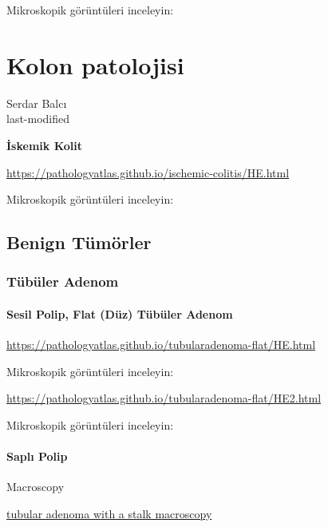\documentclass[
  letterpaper,
  DIV=11,
  numbers=noendperiod]{scrreprt}
\begin{document}
Mikroskopik görüntüleri inceleyin:

\hypertarget{kolon-patolojisi}{%
\chapter{Kolon patolojisi}\label{kolon-patolojisi}}

Serdar Balcı\\
last-modified

\hfill\break

\textbf{İskemik Kolit}

\url{https://pathologyatlas.github.io/ischemic-colitis/HE.html}

Mikroskopik görüntüleri inceleyin:

\hypertarget{benign-tuxfcmuxf6rler-1}{%
\section{Benign Tümörler}\label{benign-tuxfcmuxf6rler-1}}

\hypertarget{tuxfcbuxfcler-adenom-1}{%
\subsection{Tübüler Adenom}\label{tuxfcbuxfcler-adenom-1}}

\hypertarget{sesil-polip-flat-duxfcz-tuxfcbuxfcler-adenom-1}{%
\subsubsection{Sesil Polip, Flat (Düz) Tübüler
Adenom}\label{sesil-polip-flat-duxfcz-tuxfcbuxfcler-adenom-1}}

\url{https://pathologyatlas.github.io/tubularadenoma-flat/HE.html}

Mikroskopik görüntüleri inceleyin:

\url{https://pathologyatlas.github.io/tubularadenoma-flat/HE2.html}

Mikroskopik görüntüleri inceleyin:

\hypertarget{saplux131-polip-1}{%
\subsubsection{Saplı Polip}\label{saplux131-polip-1}}

Macroscopy

\href{https://pathologyatlas.github.io/tubularadenoma/tubular-adenoma-with-stalk-macroscopy.jpg}{tubular
adenoma with a stalk macroscopy}
\end{document}
